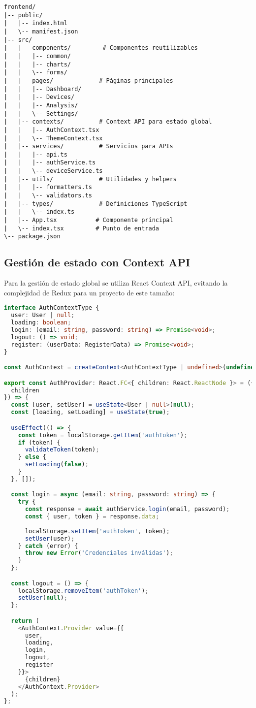 \begin{lstlisting}[caption=Estructura del proyecto frontend]
frontend/
|-- public/
|   |-- index.html
|   \-- manifest.json
|-- src/
|   |-- components/         # Componentes reutilizables
|   |   |-- common/
|   |   |-- charts/
|   |   \-- forms/
|   |-- pages/             # Páginas principales
|   |   |-- Dashboard/
|   |   |-- Devices/
|   |   |-- Analysis/
|   |   \-- Settings/
|   |-- contexts/          # Context API para estado global
|   |   |-- AuthContext.tsx
|   |   \-- ThemeContext.tsx
|   |-- services/          # Servicios para APIs
|   |   |-- api.ts
|   |   |-- authService.ts
|   |   \-- deviceService.ts
|   |-- utils/             # Utilidades y helpers
|   |   |-- formatters.ts
|   |   \-- validators.ts
|   |-- types/             # Definiciones TypeScript
|   |   \-- index.ts
|   |-- App.tsx           # Componente principal
|   \-- index.tsx         # Punto de entrada
\-- package.json
\end{lstlisting}

\subsection{Gestión de estado con Context API}

Para la gestión de estado global se utiliza React Context API, evitando la complejidad de Redux para un proyecto de este tamaño:

\begin{lstlisting}[language=TypeScript, caption=Context de autenticación]
interface AuthContextType {
  user: User | null;
  loading: boolean;
  login: (email: string, password: string) => Promise<void>;
  logout: () => void;
  register: (userData: RegisterData) => Promise<void>;
}

const AuthContext = createContext<AuthContextType | undefined>(undefined);

export const AuthProvider: React.FC<{ children: React.ReactNode }> = ({ 
  children 
}) => {
  const [user, setUser] = useState<User | null>(null);
  const [loading, setLoading] = useState(true);

  useEffect(() => {
    const token = localStorage.getItem('authToken');
    if (token) {
      validateToken(token);
    } else {
      setLoading(false);
    }
  }, []);

  const login = async (email: string, password: string) => {
    try {
      const response = await authService.login(email, password);
      const { user, token } = response.data;
      
      localStorage.setItem('authToken', token);
      setUser(user);
    } catch (error) {
      throw new Error('Credenciales inválidas');
    }
  };

  const logout = () => {
    localStorage.removeItem('authToken');
    setUser(null);
  };

  return (
    <AuthContext.Provider value={{
      user,
      loading,
      login,
      logout,
      register
    }}>
      {children}
    </AuthContext.Provider>
  );
};
\end{lstlisting}

